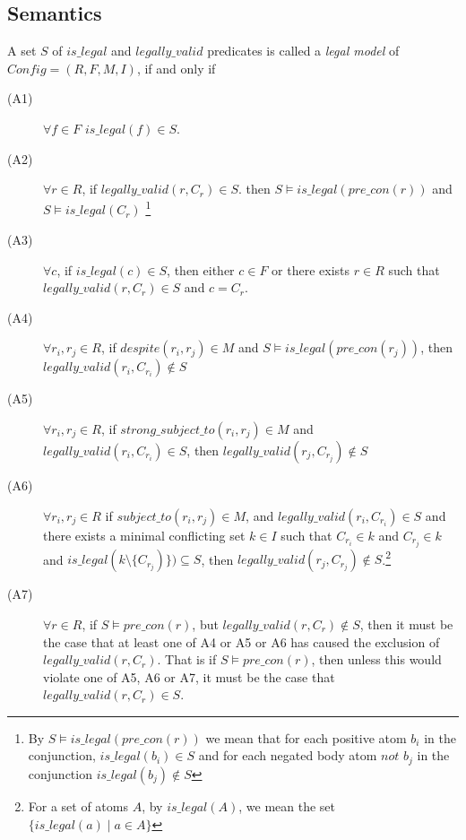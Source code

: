 \subsection{Semantics}

A set $S$ of $is\_legal$ and $legally\_valid$ predicates is called a \textit{legal model} of $Config = (R,F,M,I)$, if and only if
\begin{description}
\item[(A1)]$\forall f \in F$ $is\_legal(f) \in S$.

\item[(A2)] $\forall r \in R$, if $legally\_valid(r,C_{r}) \in S$. then $S\models is\_legal(pre\_con(r))$ and $S\models is\_legal(C_{r})$ \footnote{By $S\models is\_legal(pre\_con(r))$ we mean that for each positive atom $b_{i}$ in the conjunction, $is\_legal(b_{i}) \in S$ and for each negated body atom $not$ $b_{j}$ in the conjunction $is\_legal(b_{j})\notin S$ }

\item[(A3)] $\forall c$, if $is\_legal(c) \in S$, then either $c\in F$ or there exists $r \in R$ such that $legally\_valid(r,C_{r}) \in S$ and $c= C_{r}$.

\item[(A4)] $\forall r_{i}, r_{j} \in R$, if $despite(r_{i}, r_{j}) \in M$ and $S\models is\_legal(pre\_con(r_{j}))$, then $legally\_valid(r_{i},C_{r_{i}}) \notin S$

\item[(A5)] $\forall r_{i}, r_{j} \in R$, if $strong\_subject\_to(r_{i}, r_{j}) \in M$ and $legally\_valid(r_{i},C_{r_{i}}) \in S$, then $legally\_valid(r_{j},C_{r_{j}}) \notin S$

\item[(A6)] $\forall r_{i},r_{j} \in R$ if $subject\_to(r_{i},r_{j}) \in M$, and $legally\_valid(r_{i},C_{r_{i}}) \in S$ and there exists a minimal conflicting set $k \in I$ such that $C_{r_{i}} \in k$ and $C_{r_{j}}\in k$ and $is\_legal(k\setminus \{C_{r_{j}})\})\subseteq S $, then $legally\_valid(r_{j},C_{r_{j}}) \notin S$.\footnote{For a set of atoms $A$, by $is\_legal(A)$, we mean the set $\{is\_legal(a)\mid a\in A\}$}

\item[(A7)] $\forall r\in R$, if $S\models pre\_con(r)$, but $legally\_valid(r,C_{r})\notin S$, then it must be the case that at least one of A4 or A5 or A6 has caused the exclusion of $legally\_valid(r,C_{r})$. That is if $S\models pre\_con(r)$, then unless this would violate one of A5, A6 or A7, it must be the case that $legally\_valid(r,C_{r})\in S$.
\end{description}

